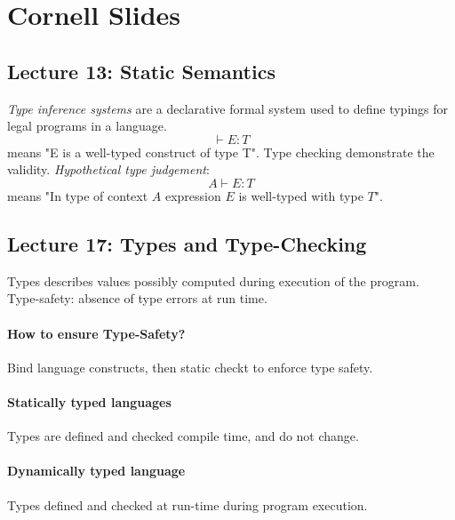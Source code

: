 \section{Cornell Slides} %
\label{sec:Cornell Slides}

\subsection{Lecture 13: Static Semantics} %
\label{sub:Lecture 13: Static Semantics}
\emph{Type inference systems} are a declarative formal system used to define typings for legal programs in a language.
\begin{equation}
	\vdash E : T
\end{equation}
means "E is a well-typed construct of type T". Type checking demonstrate the validity. \emph{Hypothetical type judgement}:
\begin{equation}
	A \vdash E : T
\end{equation}
means "In type of context $A$ expression $E$ is well-typed with type $T$".

\subsection{Lecture 17: Types and Type-Checking} %
\label{sub:Lecture 17: Types and Type-Checking}
Types describes values possibly computed during execution of the program. Type-safety: absence of type errors at run time.

\paragraph{How to ensure Type-Safety?} %
\label{par:How to ensure Type-Safety?}
Bind language constructs, then static checkt to enforce type safety.

\paragraph{Statically typed languages} %
\label{par:Statically typed languages}
Types are defined and checked compile time, and do not change.

\paragraph{Dynamically typed language} %
\label{par:Dynamically typed language}
Types defined and checked at run-time during program execution.

